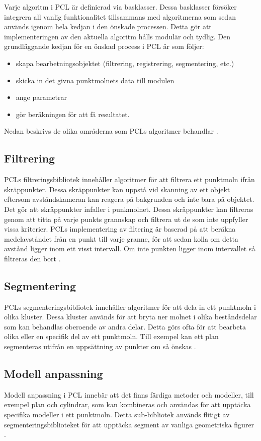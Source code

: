 Varje algoritm i PCL är definierad via basklasser. Dessa basklasser försöker integrera all vanlig funktionalitet tillsammans med algoritmerna som sedan används igenom hela kedjan i den önskade processen. Detta gör att implementeringen av den aktuella algoritm hålls modulär och tydlig. Den grundläggande kedjan för en önskad process i PCL är som följer:

\begin{itemize}
	\item skapa bearbetningsobjektet (filtrering, registrering, segmentering, etc.)
	\item skicka in det givna punktmolnets data till modulen
	\item ange parametrar
	\item gör beräkningen för att få resultatet.
\end{itemize}
Nedan beskrivs de olika områderna som PCLs algoritmer behandlar \cite{rusu20113d}.

\subsection{Filtrering}
PCLs filtreringsbibliotek innehåller algoritmer för att filtrera ett punktmoln ifrån skräppunkter. Dessa skräppunkter kan uppstå vid skanning av ett objekt eftersom avståndskameran kan reagera på bakgrunden och inte bara på objektet. Det gör att skräppunkter infaller i punkmolnet. Dessa skräppunkter kan filtreras genom att titta på varje punkts grannskap och filtrera ut de som inte uppfyller vissa kriterier. PCLs implementering av filtering är baserad på att beräkna medelavståndet från en punkt till varje granne, för att sedan kolla om detta avstånd ligger inom ett visst intervall. Om inte punkten ligger inom intervallet så filtreras den bort \cite{pcl_filtering}. 
 
\subsection{Segmentering}
PCLs segmenteringsbibliotek innehåller algoritmer för att dela in ett punktmoln i olika kluster. Dessa kluster används för att bryta ner molnet i olika beståndsdelar som kan behandlas oberoende av andra delar. Detta görs ofta för att bearbeta olika eller en specifik del av ett punktmoln. Till exempel kan ett plan segmenteras utifrån en uppsättning av punkter om så önskas \cite{pcl_segmentation}. 
 
\subsection{Modell anpassning}
Modell anpassning i PCL innebär att det finns färdiga metoder och modeller, till exempel plan och cylindrar, som kan kombineras och användas för att upptäcka specifika modeller i ett punktmoln. Detta sub-bibliotek används flitigt av segmenteringsbiblioteket för att upptäcka segment av vanliga geometriska figurer \cite{pcl_model_fitting}.

